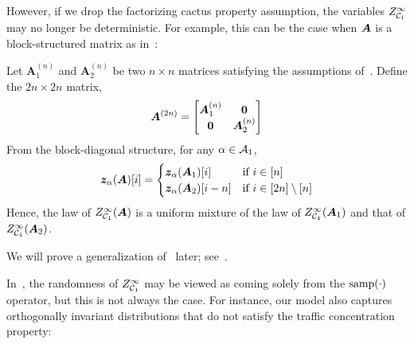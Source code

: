 However, if we drop the factorizing cactus property assumption,
the variables $Z^\infty_{{\cal C}_1}$ may no longer be deterministic. 
For example, this can be the case
when ${\bm A}$ is a block-structured matrix as
in~:
 
 \begin{example}\label{ex:block-structured}
    Let $\bm A_1^{(n)}$ and $\bm A_2^{(n)}$
    be two $n\times n$ matrices
    satisfying the assumptions of~. Define
    the $2n\times 2n$ matrix,
    \[
        {\bm A}^{(2n)} = \begin{bmatrix} {\bm A}_1^{(n)} & \bm 0\\\bm 0 & {\bm A}_2^{(n)} \end{bmatrix}
    \]
    From the block-diagonal structure, for any $\alpha\in {\cal A}_1$,
    \[
        {\bm z}_{\alpha}({\bm A})[i] = \begin{cases} {\bm z}_{\alpha}({\bm A}_1)[i] & \text{if $i\in [n]$}\\
        {\bm z}_{\alpha}({\bm A}_2)[i-n] & \text{if $i\in [2n]\setminus [n]$}\end{cases}
    \]
    Hence, the law of $Z^\infty_{{\cal C}_1}({\bm A})$ is a
    uniform mixture of the law of $Z^\infty_{{\cal C}_1}({\bm A}_1)$
    and that of $Z^\infty_{{\cal C}_1}({\bm A}_2)$.
\end{example}

\noindent We will prove a generalization of~ later; see~.

In~, the randomness of $Z^\infty_{{\cal C}_1}$
may be viewed as coming solely from the $\mathrm{samp}(\cdot)$ operator,
but this is not always the case.
For instance, our model also captures orthogonally invariant distributions
that do not satisfy the traffic concentration property:

